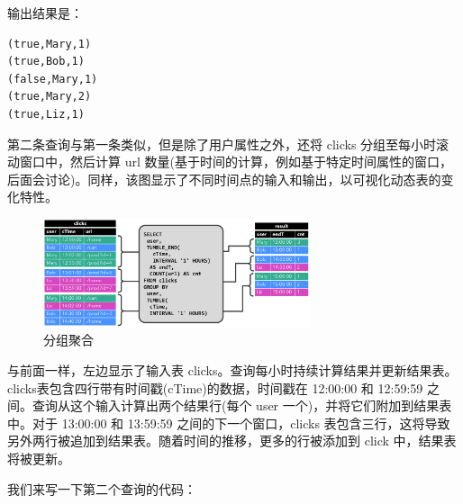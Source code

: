 \documentclass[cn,11pt,chinese]{elegantbook}
\begin{document}
输出结果是：

\begin{verbatim}
(true,Mary,1)
(true,Bob,1)
(false,Mary,1)
(true,Mary,2)
(true,Liz,1)
\end{verbatim}

第二条查询与第一条类似，但是除了用户属性之外，还将 clicks 分组至每小时滚动窗口中，然后计算 url 数量(基于时间的计算，例如基于特定时间属性的窗口，后面会讨论)。同样，该图显示了不同时间点的输入和输出，以可视化动态表的变化特性。

\begin{figure}[htbp]
    \centering
    \includegraphics[width=0.7\textwidth]{images/query-groupBy-window-cnt.png}
    \caption{分组聚合}
\end{figure}

与前面一样，左边显示了输入表 clicks。查询每小时持续计算结果并更新结果表。clicks表包含四行带有时间戳(cTime)的数据，时间戳在 12:00:00 和 12:59:59 之间。查询从这个输入计算出两个结果行(每个 user 一个)，并将它们附加到结果表中。对于 13:00:00 和 13:59:59 之间的下一个窗口，clicks 表包含三行，这将导致另外两行被追加到结果表。随着时间的推移，更多的行被添加到 click 中，结果表将被更新。

我们来写一下第二个查询的代码：
\end{document}
